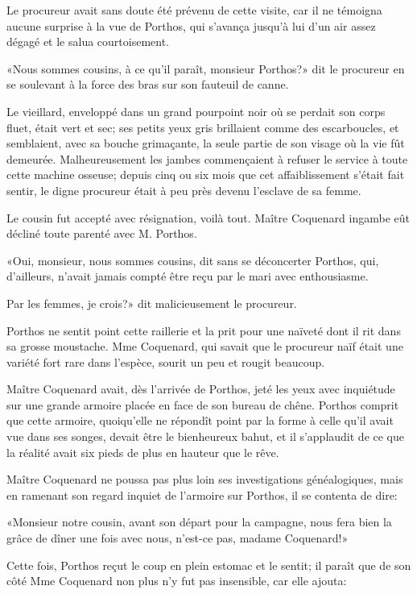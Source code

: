 Le procureur avait sans doute été prévenu de cette visite, car il ne témoigna aucune surprise à la vue de Porthos, qui s'avança jusqu'à lui d'un air assez dégagé et le salua courtoisement. 

«Nous sommes cousins, à ce qu'il paraît, monsieur Porthos?» dit le procureur en se soulevant à la force des bras sur son fauteuil de canne. 

Le vieillard, enveloppé dans un grand pourpoint noir où se perdait son corps fluet, était vert et sec; ses petits yeux gris brillaient comme des escarboucles, et semblaient, avec sa bouche grimaçante, la seule partie de son visage où la vie fût demeurée. Malheureusement les jambes commençaient à refuser le service à toute cette machine osseuse; depuis cinq ou six mois que cet affaiblissement s'était fait sentir, le digne procureur était à peu près devenu l'esclave de sa femme. 

Le cousin fut accepté avec résignation, voilà tout. Maître Coquenard ingambe eût décliné toute parenté avec M. Porthos. 

«Oui, monsieur, nous sommes cousins, dit sans se déconcerter Porthos, qui, d'ailleurs, n'avait jamais compté être reçu par le mari avec enthousiasme. 

\speak  Par les femmes, je crois?» dit malicieusement le procureur. 

Porthos ne sentit point cette raillerie et la prit pour une naïveté dont il rit dans sa grosse moustache. Mme Coquenard, qui savait que le procureur naïf était une variété fort rare dans l'espèce, sourit un peu et rougit beaucoup. 

Maître Coquenard avait, dès l'arrivée de Porthos, jeté les yeux avec inquiétude sur une grande armoire placée en face de son bureau de chêne. Porthos comprit que cette armoire, quoiqu'elle ne répondît point par la forme à celle qu'il avait vue dans ses songes, devait être le bienheureux bahut, et il s'applaudit de ce que la réalité avait six pieds de plus en hauteur que le rêve. 

Maître Coquenard ne poussa pas plus loin ses investigations généalogiques, mais en ramenant son regard inquiet de l'armoire sur Porthos, il se contenta de dire: 

«Monsieur notre cousin, avant son départ pour la campagne, nous fera bien la grâce de dîner une fois avec nous, n'est-ce pas, madame Coquenard!» 

Cette fois, Porthos reçut le coup en plein estomac et le sentit; il paraît que de son côté Mme Coquenard non plus n'y fut pas insensible, car elle ajouta: 

